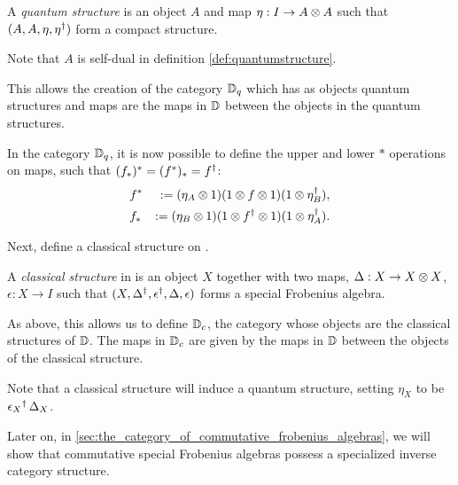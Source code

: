 \begin{definition}\label{def:quantumstructure}
  A \emph{quantum structure} is an object $A$ and map $\eta:I\to A\otimes A$ such that
  $(A,A,\eta,{\eta}^{\dagger})$ form a compact structure.
\end{definition}
Note that $A$ is self-dual in definition \ref{def:quantumstructure}.

This allows the creation of the category $\mathbb{D}_{q}$ which has as objects quantum structures and maps
are the maps in $\mathbb{D}$ between the objects in the quantum structures.

In the category $\mathbb{D}_{q}$, it is now possible to define the upper and lower $*$ operations on maps,
such that $(f_{*})^{*}= (f^{*})_{*} = {f}^{\dagger}$:
\begin{eqnarray*}
&f^{*} &:= (\eta_{A}\otimes1) (1 \otimes f\otimes1) (1\otimes{\eta}^{\dagger}_{B}),\\
&f_{*} &:= (\eta_{B}\otimes1) (1 \otimes {f}^{\dagger}\otimes1) (1\otimes{\eta}^{\dagger}_{A}).
\end{eqnarray*}

Next, define a classical structure on \cD.
\begin{definition}\label{def:classicalstructure}
  A \emph{classical structure} in \cD{} is an object $X$ together with two maps, $\Delta :X \to X\otimes X$,
  $\epsilon:X\to I$ such that $(X,{\Delta}^{\dagger},{\epsilon}^{\dagger},\Delta,\epsilon)$ forms a special
  Frobenius algebra.
\end{definition}

As above, this allows us to define $\mathbb{D}_{c}$, the category whose objects are the classical
structures of $\mathbb{D}$. The maps in $\mathbb{D}_{c}$ are given by the maps in $\mathbb{D}$ between the
objects of the classical structure.

Note that a classical structure will induce a quantum structure, setting $\eta_{X}$ to be
${\epsilon_{X}}^{\dagger}\, \Delta_{X}$.


Later on, in \ref{sec:the_category_of_commutative_frobenius_algebras}, we will show that commutative
special Frobenius algebras possess a specialized inverse category structure.



